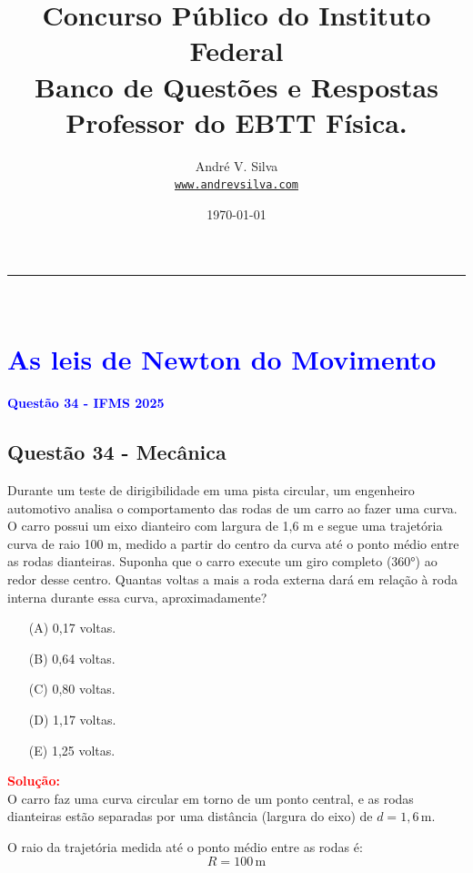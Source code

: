 \documentclass[a4paper,12pt]{article}
\title{Concurso Público do Instituto Federal \\ Banco de Questões e Respostas \\ Professor do EBTT \textbf{\large F\'isica}.}
\author{Andr\'e V. Silva \\ \texttt{\url{www.andrevsilva.com}}}
\date{\today}
\begin{document}
\maketitle

\tableofcontents

\newpage

\justifying

\noindent\rule{\linewidth}{0.6pt}\\

\section{\large \textcolor{blue}{ As leis de Newton do Movimento}}

\begin{flushleft}
\textbf{\textcolor{blue}{\Large Quest\~ao 34 - IFMS 2025}}\\
\subsection{Quest\~ao 34 - Mecânica}
Durante um teste de dirigibilidade em uma pista circular, um engenheiro automotivo analisa o comportamento das 
rodas de um carro ao fazer uma curva. O carro possui um eixo dianteiro com largura de 1,6 m e segue uma trajetória 
curva de raio 100 m, medido a partir do centro da curva até o ponto médio entre as rodas dianteiras. Suponha que o 
carro execute um giro completo (360°) ao redor desse centro. Quantas voltas a mais a roda externa dará em relação à 
roda interna durante essa curva, aproximadamente?

\begin{itemize}
\item[(A)] 0,17 voltas.
\item[(B)] 0,64 voltas.
\item[(C)] 0,80 voltas.
\item[(D)] 1,17 voltas.
\item[(E)] 1,25 voltas.

\end{itemize}

\vspace{0.5cm}

\textcolor{red}{\textbf{Solução:}}\\

O carro faz uma curva circular em torno de um ponto central, e as rodas dianteiras estão separadas por uma distância (largura do eixo) de $d = 1,6\,\text{m}$.

O raio da trajetória medida até o ponto médio entre as rodas é:
\[
R = 100\,\text{m}
\]


\end{flushleft}
\end{document}
